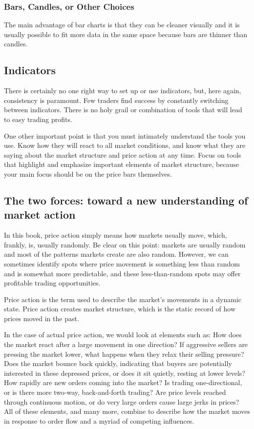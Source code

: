 \documentclass[10pt,twocolumn]{article}
\begin{document}
\subsubsection{Bars, Candles, or Other Choices}
The main advantage of bar charts is that they can be cleaner visually and it is usually possible to fit more data in the same space because bars are thinner than candles.


\subsection{Indicators}
There is certainly no one right way to set up or use indicators, but, here again, consistency is paramount. Few traders find success by constantly switching between indicators. There is no holy grail or combination of tools that will lead to easy trading profits.

One other important point is that you must intimately understand the tools you use. Know how they will react to all market conditions, and know what they are saying about the market structure and price action at any time. Focus on tools that highlight and emphasize important elements of market structure, because your main focus should be on the price bars themselves.

\subsection{The two forces: toward a new understanding of market action}
In this book, price action simply means how markets usually move, which, frankly, is, usually randomly. Be clear on this point: markets are usually random and most of the patterns markets create are also random. However, we can sometimes identify spots where price movement is something less than random and is somewhat more predictable, and these less-than-random spots may offer profitable trading opportunities.

Price action is the term used to describe the market’s movements in a dynamic state. Price action creates market structure, which is the static record of how prices moved in the past.

In the case of actual price action, we would look at elements such as: How does the market react after a large movement in one direction? If aggressive sellers are pressing the market lower, what happens when they relax their selling pressure? Does the market bounce back quickly, indicating that buyers are potentially interested in these depressed prices, or does it sit quietly, resting at lower levels? How rapidly are new orders coming into the market? Is trading one-directional, or is there more two-way, back-and-forth trading? Are price levels reached through continuous motion, or do very large orders cause large jerks in prices? All of these elements, and many more, combine to describe how the market moves in response to order flow and a myriad of competing influences.
\end{document}
